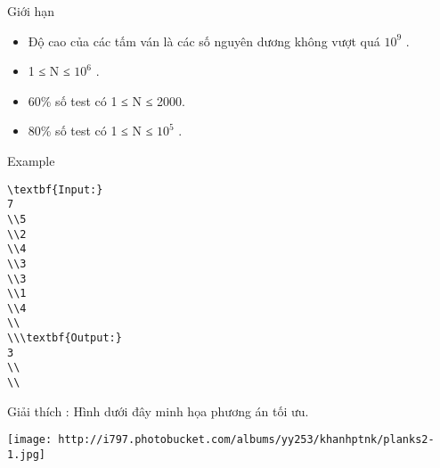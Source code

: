 Giới hạn  
\begin{itemize}
	\item     Độ cao của các tấm ván là các số nguyên dương không vượt quá $10^{9}$    .   
	\item     1 ≤ N ≤ $10^{6}$    .   
	\item     60\% số test có 1 ≤ N ≤ 2000.   
	\item     80\% số test có 1 ≤ N ≤ $10^{5}$    .   
\end{itemize}
   Example  
\begin{verbatim}
\textbf{Input:}
7
\\5
\\2
\\4
\\3
\\3
\\1
\\4
\\
\\\textbf{Output:}
3
\\
\\\end{verbatim}

Giải thích        : Hình dưới đây minh họa phương án tối ưu.


\texttt{[image: http://i797.photobucket.com/albums/yy253/khanhptnk/planks2-1.jpg]}